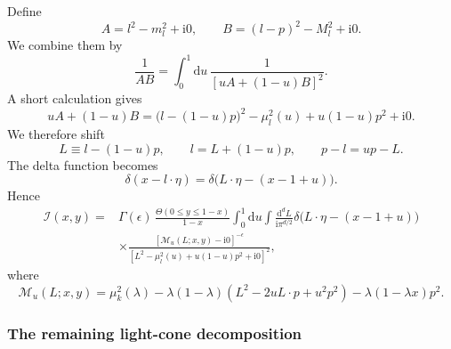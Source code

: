 \documentclass[11pt]{article}
\newcommand{\dd}{\mathrm d}
\newcommand{\ii}{\mathrm i}
\begin{document}
Define
\begin{equation}
A=l^2-m_l^2+\ii0,
\qquad
B=(l-p)^2-M_l^2+\ii0.
\label{eq:method2-A-B-def}
\end{equation}
We combine them by
\begin{equation}
\frac{1}{AB}=\int_0^1 \dd u\,
\frac{1}{[uA+(1-u)B]^2}.
\label{eq:method2-feynman-param}
\end{equation}
A short calculation gives
\begin{equation}
uA+(1-u)B=\bigl(l-(1-u)p\bigr)^2-\mu_l^2(u)+u(1-u)p^2+\ii0.
\label{eq:method2-combined-denominator}
\end{equation}
We therefore shift
\begin{equation}
L\equiv l-(1-u)p,
\qquad
l=L+(1-u)p,
\qquad
p-l=up-L.
\label{eq:method2-L-shift}
\end{equation}
The delta function becomes
\begin{equation}
\delta(x-l\!\cdot\!\eta)=
\delta\bigl(L\!\cdot\!\eta-(x-1+u)\bigr).
\label{eq:method2-delta-shift}
\end{equation}
Hence
\begin{align}
\mathcal I(x,y)
={}&
\Gamma(\epsilon)\,
\frac{\Theta(0\leq y\leq 1-x)}{1-x}
\int_0^1 \dd u
\int \frac{\dd^d L}{\ii\pi^{d/2}}
\delta\bigl(L\!\cdot\!\eta-(x-1+u)\bigr)
\nonumber\\
&\times
\frac{[\mathcal M_u(L;x,y)-\ii0]^{-\epsilon}}
{[L^2-\mu_l^2(u)+u(1-u)p^2+\ii0]^2},
\label{eq:Ishifted}
\end{align}
where
\begin{equation}
\mathcal M_u(L;x,y)=
\mu_k^2(\lambda)-\lambda(1-\lambda)(L^2-2uL\!\cdot p+u^2p^2)-\lambda(1-\lambda x)p^2.
\label{eq:MuL}
\end{equation}

\subsubsection{The remaining light-cone decomposition}
\end{document}
